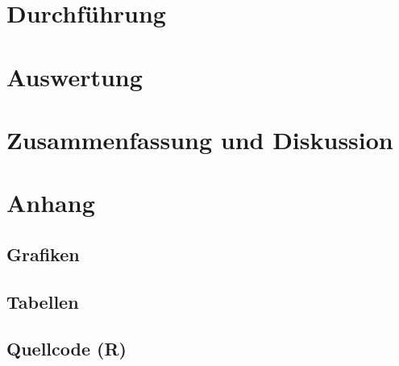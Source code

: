 \documentclass[12pt]{article}
\newcommand{\code}[1]{\texttt{#1}}
\begin{document}
\newpage
\section{Durchführung}\label{durchfuehrung}


\newpage
\section{Auswertung}
\newpage
\section{Zusammenfassung und Diskussion}
\label{diskussion}

\newpage
\section{Anhang}

\subsection{Grafiken}\label{bilder}




\subsection{Tabellen}\label{tabellen}


%
\clearpage
\subsection{Quellcode (R)}
%

\newpage
\listoffigures
\end{document}

